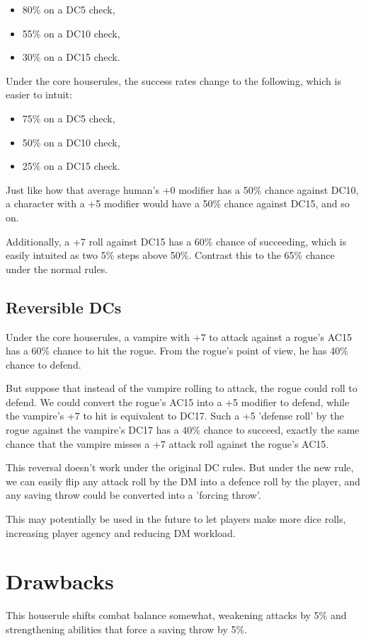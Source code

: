 \documentclass[letterpaper,twocolumn,openany,nodeprecatedcode,bg=print]{dndbook}
\begin{document}
\begin{itemize}
\item 80\% on a DC5 check,
\item 55\% on a DC10 check,
\item 30\% on a DC15 check.
\end{itemize}

\noindent Under the core houserules, the success rates change to the following, which is easier to intuit:

\begin{itemize}
\item 75\% on a DC5 check,
\item 50\% on a DC10 check,
\item 25\% on a DC15 check.
\end{itemize}

\noindent Just like how that average human's +0 modifier has a 50\% chance against DC10, a character with a +5 modifier would have a 50\% chance against DC15, and so on.

Additionally, a +7 roll against DC15 has a 60\% chance of succeeding, which is easily intuited as two 5\% steps above 50\%. 
Contrast this to the 65\% chance under the normal rules.

\subsection{Reversible DCs}
Under the core houserules, a vampire with +7 to attack against a rogue's AC15 has a 60\% chance to hit the rogue. 
From the rogue's point of view, he has 40\% chance to defend. 

But suppose that instead of the vampire rolling to attack, the rogue could roll to defend. We could convert the rogue's AC15 into a +5 modifier to defend, while the vampire's +7 to hit is equivalent to DC17. Such a +5 'defense roll' by the rogue against the vampire's DC17 has a 40\% chance to succeed, exactly the same chance that the vampire misses a +7 attack roll against the rogue's AC15.

This reversal doesn't work under the original DC rules. But under the new rule, we can easily flip any attack roll by the DM into a defence roll by the player, and any saving throw could be converted into a 'forcing throw'.

This may potentially be used in the future to let players make more dice rolls, increasing player agency and reducing DM workload.

\section{Drawbacks}
This houserule shifts combat balance somewhat, weakening attacks by 5\% and strengthening abilities that force a saving throw by 5\%. 
\end{document}

